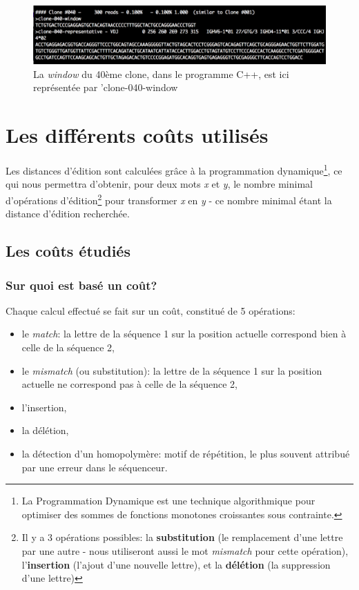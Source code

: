 \documentclass[pdftex,12pt,a4paper]{report}
\begin{document}
\begin{spacing}{1.2}
\begin{figure}[H]
\begin{center}
	\includegraphics[scale=0.6]{img/C++-window.jpg}
\end{center}
\caption{La \textit{window} du 40ème clone, dans le programme C++, est ici représentée par 'clone-040-window}
\end{figure}

\section{Les différents coûts utilisés}

Les distances d'édition sont calculées grâce à la programmation dynamique\footnote{La Programmation Dynamique est une technique algorithmique pour optimiser des sommes de fonctions monotones croissantes sous contrainte.}, ce qui nous permettra d'obtenir, pour deux mots \textit{x} et \textit{y}, le nombre minimal d’opérations d’édition\footnote{Il y a 3 opérations possibles: la \textbf{substitution} (le remplacement d'une lettre par une autre - nous utiliseront aussi le mot \textit{mismatch} pour cette opération), l'\textbf{insertion} (l'ajout d'une nouvelle lettre), et la \textbf{délétion} (la suppression d'une lettre)} pour transformer \textit{x} en \textit{y} - ce nombre minimal étant la distance d'édition recherchée.

\subsection{Les coûts étudiés}

\subsubsection{Sur quoi est basé un coût?}

Chaque calcul effectué se fait sur un coût, constitué de 5 opérations:
\begin{itemize}
\item{le \textit{match}: la lettre de la séquence 1 sur la position actuelle correspond bien à celle de la séquence 2,}
\item{le \textit{mismatch} (ou substitution): la lettre de la séquence 1 sur la position actuelle ne correspond pas à celle de la séquence 2,}
\item{l'insertion,}
\item{la délétion,}
\item{la détection d'un homopolymère: motif de répétition, le plus souvent attribué par une erreur dans le séquenceur.}
\end{itemize}


\end{spacing}
\end{document}
